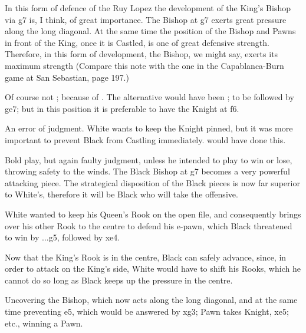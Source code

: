 \documentclass[10pt,twoside]{article}
\begin{document}
In this form of defence of the Ruy Lopez the development of the King's Bishop via g7 is, I think, of great importance. The Bishop at g7 exerts great pressure along the long diagonal. At the same time the position of the Bishop and Pawns in front of the King, once it is Castled, is one of great defensive strength. Therefore, in this form of development, the Bishop, we might say, exerts its maximum strength (Compare this note with the one in the Capablanca-Burn game at San Sebastian, page 197.)


Of course not ; because of . The alternative would have been ; to be followed by \figN ge7; but in this position it is preferable to have the Knight at f6.


An error of judgment. White wants to keep the Knight pinned, but it was more important to prevent Black from Castling immediately.  would have done this.


Bold play, but again faulty judgment, unless he intended to play to win or lose, throwing safety to the winds. The Black Bishop at g7 becomes a very powerful attacking piece. The strategical disposition of the Black pieces is now far superior to White's, therefore it will be Black who will take the offensive.


\board

White wanted to keep his Queen's Rook on the open file, and consequently brings over his other Rook to the centre to defend his e-pawn, which Black threatened to win by ...g5, followed by \figN xe4.


Now that the King's Rook is in the centre, Black can safely advance, since, in order to attack on the King's side, White would have to shift his Rooks, which he cannot do so long as Black keeps up the pressure in the centre.


Uncovering the Bishop, which now acts along the long diagonal, and at the same time preventing e5, which would be answered by \figN xg3; Pawn takes Knight, \figN xe5; etc., winning a Pawn.

\end{document}
